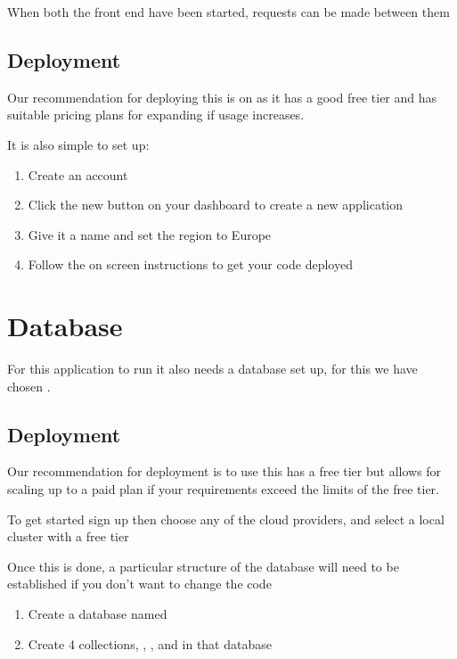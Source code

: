 \documentclass[letterpaper,10pt,english]{sphinxmanual}
\begin{document}
When both the front end have been started, requests can be made between
them


\subsection{Deployment}
\label{\detokenize{docs/Installation/backEnd:deployment}}
Our recommendation for deploying this is on
 as it has a good free tier and has
suitable pricing plans for expanding if usage increases.

It is also simple to set up:
\begin{enumerate}
%
\item {} 
Create an account 

\item {} 
Click the new button on your dashboard to create a new application

\item {} 
Give it a name and set the region to Europe

\item {} 
Follow the on screen instructions to get your code deployed

\end{enumerate}


\section{Database}
\label{\detokenize{docs/Installation/database:database}}\label{\detokenize{docs/Installation/database::doc}}
For this application to run it also needs a database set up, for this we
have chosen .


\subsection{Deployment}
\label{\detokenize{docs/Installation/database:deployment}}
Our recommendation for deployment is to use  this has a free tier but
allows for scaling up to a paid plan if your requirements exceed the
limits of the free tier.

To get started sign up 
then choose any of the cloud providers, and select a local cluster with
a free tier

Once this is done, a particular structure of the database will need to
be established if you don’t want to change the code
\begin{enumerate}
%
\item {} 
Create a database named 

\item {} 
Create 4 collections, , ,  and  in
that database

\end{enumerate}
\end{document}
